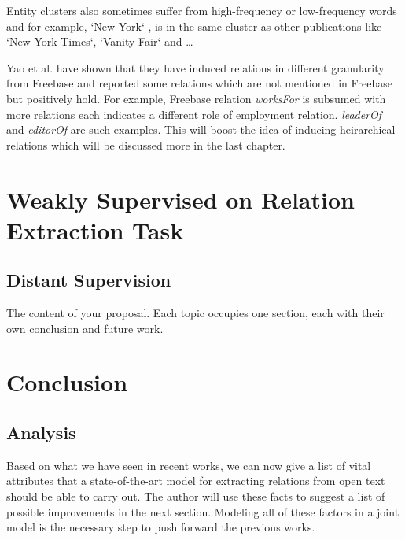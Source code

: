 \documentclass[12pt]{report}
\begin{document}
 Entity clusters also sometimes suffer from high-frequency or low-frequency words and for example, `New York`
 , is in the same cluster as other publications like `New York Times`, `Vanity Fair` and \ldots
 
 Yao et al. have shown that they have induced relations in different granularity from Freebase and reported some relations
 which are not mentioned in Freebase but positively hold. For example, Freebase relation \emph{worksFor}
  is subsumed with more relations each indicates a different role of employment relation. \emph{leaderOf}
   and \emph{editorOf} are such examples. This will boost the idea of inducing heirarchical 
   relations which will be discussed more in the last chapter.
 
 

\chapter{Weakly Supervised on Relation Extraction Task}
\label{ch:related}

\section{Distant Supervision}
\label{ch:weakly supervised}

The content of \cite{Huang2012} your proposal. Each topic occupies one section, each
with their own conclusion and future work.

\chapter{Conclusion}
\label{ch:conclusion}

\section{Analysis}
\label{ch:conclusion}

Based on what we have seen in recent works, we can now give a list of vital
attributes that a state-of-the-art model for extracting relations from open text
should be able to carry out. The author will use these facts to suggest a list of possible improvements
in the next section. Modeling all of
these factors in a joint model is the necessary step to push forward the previous
works.
\end{document}
